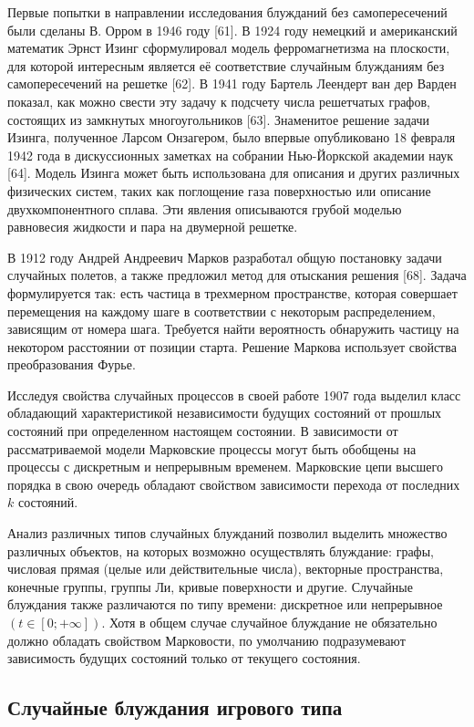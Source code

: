 Первые попытки в направлении исследования блужданий без самопересечений были сделаны В. Орром в 1946 году [61]. 
В 1924 году немецкий и американский математик Эрнст Изинг сформулировал модель ферромагнетизма на плоскости, 
для которой интересным является её соответствие случайным блужданиям без самопересечений на решетке [62]. 
В 1941 году Бартель Леендерт ван дер Варден показал, как можно свести эту задачу к подсчету числа решетчатых графов, 
состоящих из замкнутых многоугольников [63]. Знаменитое решение задачи Изинга, полученное Ларсом Онзагером, было впервые 
опубликовано 18 февраля 1942 года в дискуссионных заметках на собрании Нью-Йоркской академии наук [64]. 
Модель Изинга может быть использована для описания и других различных физических систем, таких как поглощение 
газа поверхностью или описание двухкомпонентного сплава. Эти явления описываются грубой моделью равновесия жидкости и пара на двумерной решетке.

В 1912 году Андрей Андреевич Марков разработал общую постановку задачи случайных полетов, а также предложил метод для отыскания решения [68]. 
Задача формулируется так: есть частица в трехмерном пространстве, которая совершает перемещения на каждому шаге в соответствии с некоторым распределением, 
зависящим от номера шага. Требуется найти вероятность обнаружить частицу на некотором расстоянии от позиции старта. 
Решение Маркова использует свойства преобразования Фурье.

Исследуя свойства случайных процессов в своей работе 1907 года выделил класс обладающий характеристикой независимости 
будущих состояний от прошлых состояний при определенном настоящем состоянии. В зависимости от рассматриваемой модели 
Марковские процессы могут быть обобщены на процессы с дискретным и непрерывным временем. Марковские цепи высшего порядка
в свою очередь обладают свойством зависимости перехода от последних $k$ состояний.

Анализ различных типов случайных блужданий позволил выделить множество различных объектов, на которых возможно осуществлять блуждание:
графы, числовая прямая (целые или действительные числа), векторные пространства, конечные группы, группы Ли, кривые поверхности и другие.
Случайные блуждания также различаются по типу времени: дискретное или непрерывное $(t \in [0; +\infty])$. 
Хотя в общем случае случайное блуждание не обязательно должно обладать свойством Марковости, 
по умолчанию подразумевают зависимость будущих состояний только от текущего состояния.

\subsection{Случайные блуждания игрового типа}\label{subsec:ch1/sec1/sub4}

